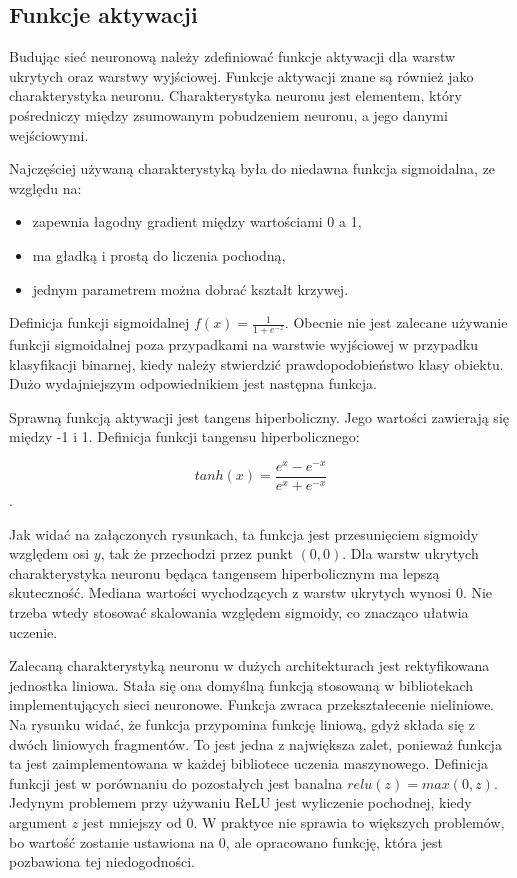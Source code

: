 \documentclass[12pt,a4paper,twoside,titlepage,openright]{book}
\begin{document}
\subsection{Funkcje aktywacji}
Budując sieć neuronową należy zdefiniować funkcje aktywacji dla warstw ukrytych oraz warstwy wyjściowej. Funkcje aktywacji znane są również jako charakterystyka neuronu. Charakterystyka neuronu jest elementem, który pośredniczy między zsumowanym pobudzeniem neuronu, a jego danymi wejściowymi. 

Najczęściej używaną charakterystyką była do niedawna funkcja sigmoidalna, ze względu na:
\begin{itemize}
\item zapewnia łagodny gradient między wartościami 0 a 1,
\item ma gładką i prostą do liczenia pochodną,
\item jednym parametrem można dobrać kształt krzywej.
\end{itemize}
Definicja funkcji sigmoidalnej \(f(x) = \frac{1}{1+e^{-z}}\).
Obecnie nie jest zalecane używanie funkcji sigmoidalnej poza przypadkami na warstwie wyjściowej w przypadku klasyfikacji binarnej, kiedy należy stwierdzić prawdopodobieństwo klasy obiektu. Dużo wydajniejszym odpowiednikiem jest następna funkcja.

Sprawną funkcją aktywacji jest tangens hiperboliczny. Jego wartości zawierają się między -1 i 1. Definicja funkcji tangensu hiperbolicznego:

$$tanh(x) = \frac{e^{x} - e^{-x}}{e^{x} + e^{-x}}$$. 

Jak widać na załączonych rysunkach, ta funkcja jest przesunięciem sigmoidy względem osi \(y\), tak że przechodzi przez punkt \((0,0)\). Dla warstw ukrytych charakterystyka neuronu będąca tangensem hiperbolicznym ma lepszą skuteczność. Mediana wartości wychodzących z warstw ukrytych wynosi 0. Nie trzeba wtedy stosować skalowania względem sigmoidy, co znacząco ułatwia uczenie.

Zalecaną charakterystyką neuronu w dużych architekturach jest rektyfikowana jednostka liniowa. Stała się ona domyślną funkcją stosowaną w bibliotekach implementujących sieci neuronowe. Funkcja zwraca przekształecenie nieliniowe. Na rysunku widać, że funkcja przypomina funkcję liniową, gdyż składa się z dwóch liniowych fragmentów. To jest jedna z największa zalet, ponieważ funkcja ta jest zaimplementowana w każdej bibliotece uczenia maszynowego. Definicja funkcji jest w porównaniu do pozostałych jest banalna \(relu(z) = max(0,z)\). Jedynym problemem przy używaniu ReLU jest wyliczenie pochodnej, kiedy argument \(z\) jest mniejszy od 0. W praktyce nie sprawia to większych problemów, bo wartość zostanie ustawiona na 0, ale opracowano funkcję, która jest pozbawiona tej niedogodności.
\end{document}
